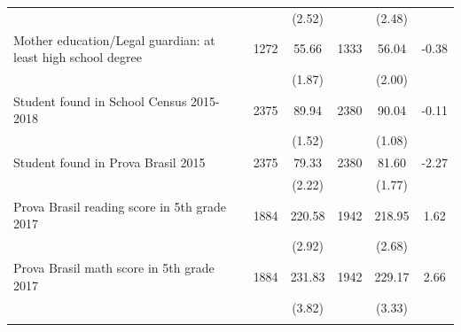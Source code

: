 \documentclass[
	article,			%
	12pt,				%
	oneside,			%
	a4paper,			%
	]{article}
\begin{document}
\begin{table}[h!]
\begin{tabular}{lccccc}
           &            &     (2.52) &            &     (2.48) &            \\

Mother education/Legal guardian: at least high school degree &       1272 &      55.66 &       1333 &      56.04 &      -0.38 \\

           &            &     (1.87) &            &     (2.00) &            \\

Student found in School Census 2015-2018 &       2375 &      89.94 &       2380 &      90.04 &      -0.11 \\

           &            &     (1.52) &            &     (1.08) &            \\

Student found in Prova Brasil 2015 &       2375 &      79.33 &       2380 &      81.60 &      -2.27 \\

           &            &     (2.22) &            &     (1.77) &            \\

Prova Brasil reading score in 5th grade 2017 &       1884 &     220.58 &       1942 &     218.95 &       1.62 \\

           &            &     (2.92) &            &     (2.68) &            \\

Prova Brasil math score in 5th grade 2017 &       1884 &     231.83 &       1942 &     229.17 &       2.66 \\

           &            &     (3.82) &            &     (3.33) &            \\

           &            &            &            &            &            \\


\hline
\end{tabular}
 \label{tab:balance_adm1}%
\par\vspace{2pt}
\end{table}
\end{document}
